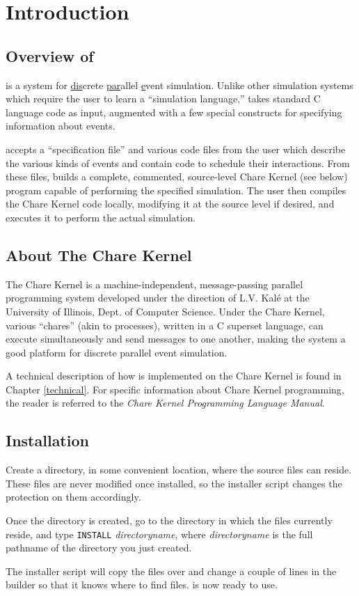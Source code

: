 
\chapter{Introduction}

\section{Overview of \dispare}

\dispare is a system for \underline{dis}crete \underline{par}allel
\underline{e}vent simulation.  Unlike other simulation systems which
require the user to learn a ``simulation language,'' \dispare takes
standard C language code as input, augmented with a few
special constructs for specifying information about events.

\dispare accepts a ``specification file'' and various code files from
the user which describe the various kinds of events and contain code
to schedule their interactions.  From these files, \dispare builds a
complete, commented, source-level Chare Kernel (see below) program
capable of performing the specified simulation.  The user then compiles
the Chare Kernel code locally, modifying it at the source level if
desired, and executes it to perform the actual simulation.

\section{About The Chare Kernel}

The Chare Kernel is a machine-independent, message-passing parallel
programming system developed under the direction of L.V. Kal\'e at the
University of Illinois, Dept. of Computer Science.  Under the Chare
Kernel, various ``chares'' (akin to processes), written in a C
superset language, can execute simultaneously and send messages to one
another, making the system a good platform for discrete parallel event
simulation.

A technical description of how \dispare is implemented on the Chare
Kernel is found in Chapter \ref{technical}.  For specific information
about Chare Kernel programming, the reader is referred to the {\em Chare
Kernel Programming Language Manual}.

\section{\dispare Installation}

Create a directory, in some convenient location, where the \dispare
source files can reside.  These files are never modified once installed,
so the installer script changes the protection on them accordingly.

Once the directory is created, go to the directory in which the \dispare
files currently reside, and type {\tt INSTALL} {\em directoryname},
where {\em directoryname} is the full pathname of the directory you just
created. 

The installer script will copy the files over and change a couple of
lines in the builder so that it knows where to find \dispare files.
\dispare is now ready to use.
